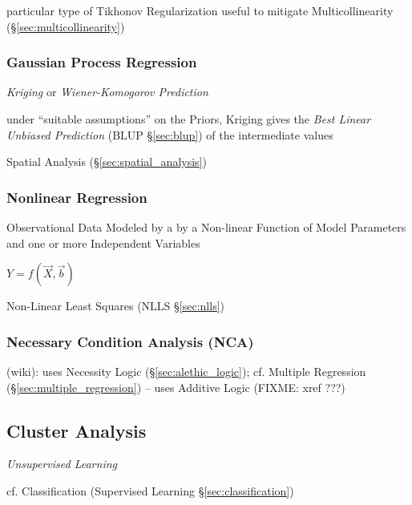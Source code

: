 particular type of Tikhonov Regularization useful to mitigate Multicollinearity
(\S\ref{sec:multicollinearity})



\subsubsection{Gaussian Process Regression}
\label{sec:gaussian_process_regression}

\emph{Kriging} or \emph{Wiener-Komogorov Prediction}

under ``suitable assumptions'' on the Priors, Kriging gives the \emph{Best
  Linear Unbiased Prediction} (BLUP \S\ref{sec:blup}) of the intermediate values

\fist Spatial Analysis (\S\ref{sec:spatial_analysis})



\subsubsection{Nonlinear Regression}\label{sec:nonlinear_regression}

Observational Data Modeled by a by a Non-linear Function of Model Parameters and
one or more Independent Variables

$Y = f(\vec{X}, \vec{b})$

Non-Linear Least Squares (NLLS \S\ref{sec:nlls})



\subsubsection{Necessary Condition Analysis (NCA)}\label{sec:nca}

(wiki): uses Necessity Logic (\S\ref{sec:alethic_logic});
cf. Multiple Regression (\S\ref{sec:multiple_regression}) -- uses Additive Logic
(FIXME: xref ???)



\subsection{Cluster Analysis}\label{sec:cluster_analysis}

\emph{Unsupervised Learning}

cf. Classification (Supervised Learning \S\ref{sec:classification})

